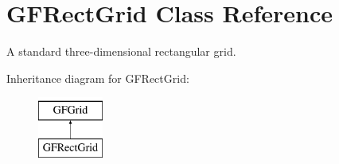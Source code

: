 \hypertarget{class_g_f_rect_grid}{\section{G\+F\+Rect\+Grid Class Reference}
\label{class_g_f_rect_grid}
}


A standard three-\/dimensional rectangular grid. 


Inheritance diagram for G\+F\+Rect\+Grid\+:\begin{figure}[H]
\begin{center}
\leavevmode
\includegraphics[height=2.000000cm]{class_g_f_rect_grid}
\end{center}
\end{figure}
